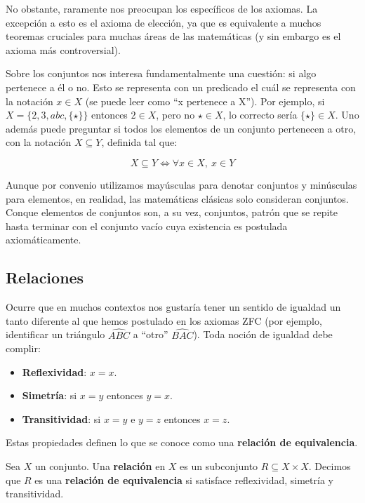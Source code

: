\documentclass[10pt]{article}
\begin{document}
No obstante, raramente nos preocupan los específicos de los axiomas. La excepción a esto es el axioma de elección, ya que es equivalente a muchos teoremas cruciales para
muchas áreas de las matemáticas (y sin embargo es el axioma más controversial).

Sobre los conjuntos nos interesa fundamentalmente una cuestión: si algo pertenece a él o no. Esto se representa con un predicado el cuál se representa con la notación $ x \in X $
(se puede leer como ``x pertenece a X''). Por ejemplo, si $ X = \{2, 3, abc, \{\star\}\}  $ entonces $ 2 \in X $, pero no $ \star \in X $, lo correcto sería $ \{\star\} \in X $.
Uno además puede preguntar si todos los elementos de un conjunto pertenecen a otro, con la notación $ X \subseteq Y $, definida
tal que:

\[ X \subseteq Y \iff \forall x \in X, \ x \in Y \]

\begin{remark}
  Aunque por convenio utilizamos mayúsculas para denotar conjuntos y minúsculas para elementos, en realidad, las matemáticas clásicas solo consideran conjuntos. Conque elementos de
  conjuntos son, a su vez, conjuntos, patrón que se repite hasta terminar con el conjunto vacío cuya existencia es postulada axiomáticamente.
\end{remark}

\subsection{Relaciones}

Ocurre que en muchos contextos nos gustaría tener un sentido de igualdad un tanto diferente al que hemos postulado en los axiomas ZFC (por ejemplo, identificar un triángulo
$ \widehat{ABC} $ a ``otro'' $ \widehat{BAC} $). Toda noción de igualdad debe complir:

\begin{itemize}
  \item \textbf{Reflexividad}: $x = x$.
  \item \textbf{Simetría}: si $x = y$ entonces $y = x$.
  \item \textbf{Transitividad}: si $x = y$ e $y = z$ entonces $x = z$.
\end{itemize}

Estas propiedades definen lo que se conoce como una \textbf{relación de equivalencia}.

\begin{definition}
Sea $ X $ un conjunto. Una \textbf{relación} en $ X $ es un subconjunto $ R \subseteq X \times X $.
Decimos que $ R $ es una \textbf{relación de equivalencia} si satisface reflexividad, simetría y transitividad.
\end{definition}
\end{document}
